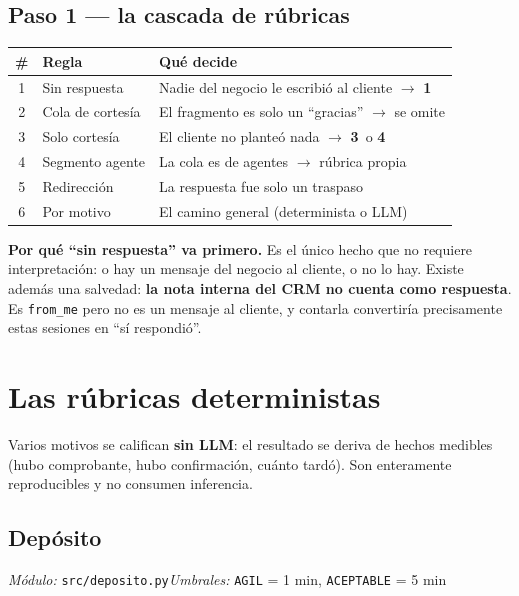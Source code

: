 \documentclass[11pt,a4paper]{article}
\newcommand{\cod}[1]{\texttt{\small #1}}
\newcommand{\est}[1]{\textbf{#1}\,\raisebox{0.5pt}{$\star$}}
\begin{document}
\subsection{Paso 1 --- la cascada de rúbricas}

\begin{center}
\begin{tabularx}{\textwidth}{@{}clX@{}}
\toprule
\textbf{\#} & \textbf{Regla} & \textbf{Qué decide} \\
\midrule
1 & Sin respuesta      & Nadie del negocio le escribió al cliente $\rightarrow$ \est{1} \\
2 & Cola de cortesía   & El fragmento es solo un ``gracias'' $\rightarrow$ se omite \\
3 & Solo cortesía      & El cliente no planteó nada $\rightarrow$ \est{3} o \est{4} \\
4 & Segmento agente    & La cola es de agentes $\rightarrow$ rúbrica propia \\
5 & Redirección        & La respuesta fue solo un traspaso \\
6 & Por motivo         & El camino general (determinista o LLM) \\
\bottomrule
\end{tabularx}
\end{center}

\begin{nota}
\textbf{Por qué ``sin respuesta'' va primero.} Es el único hecho que no requiere
interpretación: o hay un mensaje del negocio al cliente, o no lo hay. Existe además una
salvedad: \textbf{la nota interna del CRM no cuenta como respuesta}. Es \cod{from\_me}
pero no
es un mensaje al cliente, y contarla convertiría precisamente estas sesiones en ``sí
respondió''.
\end{nota}

\newpage
\section{Las rúbricas deterministas}

Varios motivos se califican \textbf{sin LLM}: el resultado se deriva de hechos medibles
(hubo comprobante, hubo confirmación, cuánto tardó). Son enteramente reproducibles y no
consumen inferencia.

\subsection{Depósito}
\emph{Módulo:} \cod{src/deposito.py}\quad\emph{Umbrales:} \cod{AGIL} = 1 min,
\cod{ACEPTABLE} = 5 min
\end{document}
